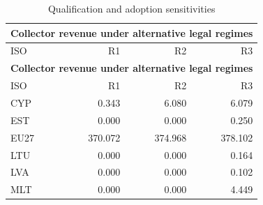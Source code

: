 {\small\setlength{\LTpre}{4pt}\setlength{\LTpost}{4pt}
\begin{longtable}{@{}lrrr@{}}
\caption{Qualification and adoption sensitivities}\label{tab:tab_v2_app_table7_regime_sensitivities} \\
\multicolumn{4}{l}{\textbf{Collector revenue under alternative legal regimes}} \\
\toprule
ISO & R1 & R2 & R3 \\
\midrule
\endfirsthead
\multicolumn{4}{l}{\textbf{Collector revenue under alternative legal regimes}} \\
\toprule
ISO & R1 & R2 & R3 \\
\midrule
\endhead
\midrule
\endfoot
\bottomrule
\endlastfoot
CYP &   0.343 &   6.080 &   6.079 \\
EST &   0.000 &   0.000 &   0.250 \\
EU27 & 370.072 & 374.968 & 378.102 \\
LTU &   0.000 &   0.000 &   0.164 \\
LVA &   0.000 &   0.000 &   0.102 \\
MLT &   0.000 &   0.000 &   4.449 \\
\end{longtable}
\par{}\par
}
